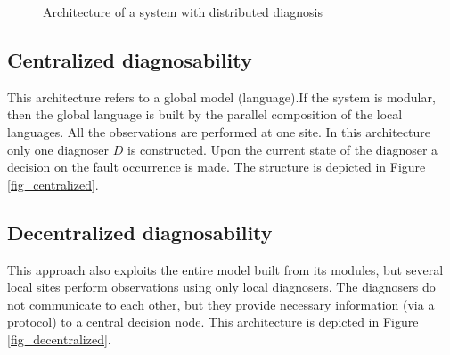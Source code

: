 \begin{figure}[t]
\centering
{}
\caption{Architecture of a system with distributed diagnosis}
\label{fig_distributed}
\end{figure}

\subsection{Centralized diagnosability}
This architecture refers to a global model (language).If the system is modular,
then the global language is built by the parallel composition of the local
languages. All the observations are performed at one site. In this architecture
only one diagnoser $D$ \cite{sampath_diagnosability_1995} is constructed. Upon
the current state of the diagnoser a decision on the fault occurrence is made.
The structure is depicted in Figure \ref{fig_centralized}.

\subsection{Decentralized diagnosability}
This approach also exploits the entire model built from its modules, but several
local sites perform observations using only local diagnosers.
The diagnosers do not communicate to each other, but they provide necessary
information (via a protocol) to a central decision node. This architecture is
depicted in Figure \ref{fig_decentralized}.

